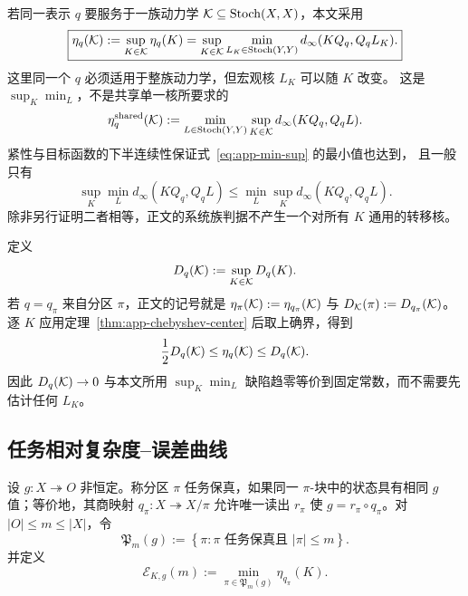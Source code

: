 若同一表示 $q$ 要服务于一族动力学 $\mathcal K\subseteq\operatorname{Stoch}(X,X)$，本文采用
\begin{equation}
 \boxed{
 \eta_q(\mathcal K)
 :=\sup_{K\in\mathcal K}\eta_q(K)
 =\sup_{K\in\mathcal K}\min_{L_K\in\operatorname{Stoch}(Y,Y)}
 d_\infty(KQ_q,Q_qL_K).}
 \label{eq:app-sup-min}
\end{equation}
这里同一个 $q$ 必须适用于整族动力学，但宏观核 $L_K$ 可以随 $K$ 改变。
这是\emph{$\sup_K\min_L$}，不是共享单一核所要求的
\begin{equation}
 \eta_q^{\mathrm{shared}}(\mathcal K)
 :=\min_{L\in\operatorname{Stoch}(Y,Y)}\sup_{K\in\mathcal K}
 d_\infty(KQ_q,Q_qL).
 \label{eq:app-min-sup}
\end{equation}
紧性与目标函数的下半连续性保证式~\eqref{eq:app-min-sup} 的最小值也达到，
且一般只有
\begin{equation}
  \sup_K\min_L d_\infty(KQ_q,Q_qL)
  \le
  \min_L\sup_K d_\infty(KQ_q,Q_qL).
  \label{eq:app-minimax-order}
\end{equation}
除非另行证明二者相等，正文的系统族判据不产生一个对所有 $K$ 通用的转移核。

定义
\begin{equation}
  D_q(\mathcal K):=\sup_{K\in\mathcal K}D_q(K).
  \label{eq:app-family-diameter}
\end{equation}
若 $q=q_\pi$ 来自分区 $\pi$，正文的记号就是
$\eta_\pi(\mathcal K):=\eta_{q_\pi}(\mathcal K)$ 与
$D_{\mathcal K}(\pi):=D_{q_\pi}(\mathcal K)$。
逐 $K$ 应用定理~\ref{thm:app-chebyshev-center} 后取上确界，得到
\begin{equation}
  \frac12D_q(\mathcal K)\le\eta_q(\mathcal K)\le D_q(\mathcal K).
  \label{eq:app-family-diameter-radius}
\end{equation}
因此 $D_q(\mathcal K)\to0$ 与本文所用
$\sup_K\min_L$ 缺陷趋零等价到固定常数，而不需要先估计任何 $L_K$。

\subsection{任务相对复杂度--误差曲线}

设 $g:X\twoheadrightarrow O$ 非恒定。称分区 $\pi$ 任务保真，如果同一
$\pi$-块中的状态具有相同 $g$ 值；等价地，其商映射
$q_\pi:X\twoheadrightarrow X/\pi$ 允许唯一读出 $r_\pi$ 使
$g=r_\pi\circ q_\pi$。对 $|O|\le m\le|X|$，令
\[
 \mathfrak P_m(g):=
 \left\{\pi:\pi\text{ 任务保真且 }|\pi|\le m\right\}.
\]
并定义
\begin{equation}
  \mathcal E_{K,g}(m):=\min_{\pi\in\mathfrak P_m(g)}\eta_{q_\pi}(K).
  \label{eq:app-complexity-error-curve}
\end{equation}

